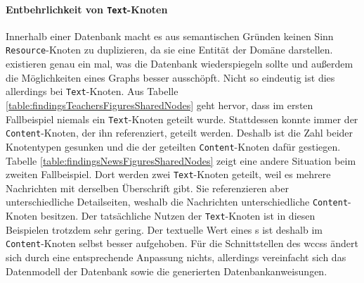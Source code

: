     \paragraph{Entbehrlichkeit von \texttt{Text}-Knoten}
    Innerhalb einer Datenbank macht es aus semantischen Gründen keinen Sinn
    \texttt{Resource}-Knoten zu duplizieren,
    da sie eine Entität der Domäne darstellen.
    {\resources} existieren genau ein mal, was die Datenbank wiederspiegeln sollte
    und außerdem die Möglichkeiten eines Graphs besser ausschöpft.
    Nicht so eindeutig ist dies allerdings bei \texttt{Text}-Knoten.
    Aus Tabelle \ref{table:findingsTeachersFiguresSharedNodes} geht hervor,
    dass im ersten Fallbeispiel niemals ein \texttt{Text}-Knoten geteilt wurde.
    Stattdessen konnte immer der \texttt{Content}-Knoten,
    der ihn referenziert, geteilt werden.
    Deshalb ist die Zahl beider Knotentypen gesunken und die der geteilten
    \texttt{Content}-Knoten dafür gestiegen.
    Tabelle \ref{table:findingsNewsFiguresSharedNodes}
    zeigt eine andere Situation beim zweiten Fallbeispiel.
    Dort werden zwei \texttt{Text}-Knoten geteilt,
    weil es mehrere Nachrichten mit derselben Überschrift gibt.
    Sie referenzieren aber unterschiedliche Detailseiten,
    weshalb die Nachrichten unterschiedliche \texttt{Content}-Knoten besitzen.
    Der tatsächliche Nutzen der \texttt{Text}-Knoten ist in diesen Beispielen trotzdem sehr gering.
    Der textuelle Wert eines {\contentFeature}s ist deshalb im \texttt{Content}-Knoten selbst besser aufgehoben.
    Für die Schnittstellen des \glspl{wccs} ändert sich durch eine entsprechende Anpassung nichts,
    allerdings vereinfacht sich das Datenmodell der Datenbank sowie
    die generierten Datenbankanweisungen.

